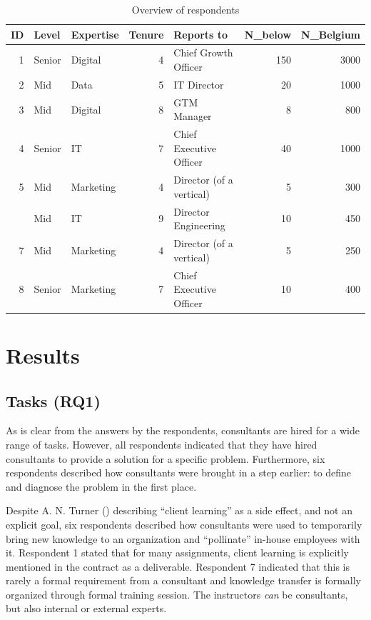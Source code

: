 \documentclass[
  man,floatsintext]{apa6}
\begin{document}
\begin{table}

\caption{\label{tab:unnamed-chunk-3}Overview of respondents}
\centering
\begin{tabular}[t]{rllrlrr}
\toprule
ID & Level & Expertise & Tenure & Reports to & N\_below & N\_Belgium\\
\midrule
1 & Senior & Digital & 4 & Chief Growth Officer & 150 & 3000\\
2 & Mid & Data & 5 & IT Director & 20 & 1000\\
3 & Mid & Digital & 8 & GTM Manager & 8 & 800\\
4 & Senior & IT & 7 & Chief Executive Officer & 40 & 1000\\
5 & Mid & Marketing & 4 & Director (of a vertical) & 5 & 300\\
\addlinespace
6 & Mid & IT & 9 & Director Engineering & 10 & 450\\
7 & Mid & Marketing & 4 & Director (of a vertical) & 5 & 250\\
8 & Senior & Marketing & 7 & Chief Executive Officer & 10 & 400\\
\bottomrule
\end{tabular}
\end{table}

\section{Results}\label{results}

\subsection{Tasks (RQ1)}\label{tasks-rq1}

As is clear from the answers by the respondents, consultants are hired for a wide range of tasks. However, all respondents indicated that they have hired consultants to provide a solution for a specific problem. Furthermore, six respondents described how consultants were brought in a step earlier: to define and diagnose the problem in the first place.

Despite A. N. Turner () describing ``client learning'' as a side effect, and not an explicit goal, six respondents described how consultants were used to temporarily bring new knowledge to an organization and ``pollinate'' in-house employees with it. Respondent 1 stated that for many assignments, client learning is explicitly mentioned in the contract as a deliverable. Respondent 7 indicated that this is rarely a formal requirement from a consultant and knowledge transfer is formally organized through formal training session. The instructors \emph{can} be consultants, but also internal or external experts.
\end{document}
